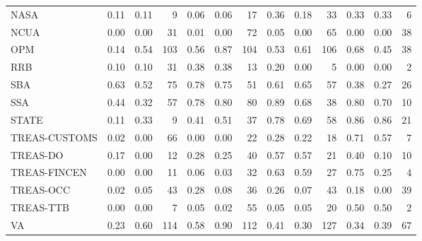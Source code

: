 \begin{table}[ht]
\begin{tabular}{lrrrrrrrrrrrr}
  NASA & 0.11 & 0.11 &   9 & 0.06 & 0.06 &  17 & 0.36 & 0.18 &  33 & 0.33 & 0.33 &   6 \\ 
  NCUA & 0.00 & 0.00 &  31 & 0.01 & 0.00 &  72 & 0.05 & 0.00 &  65 & 0.00 & 0.00 &  38 \\ 
  OPM & 0.14 & 0.54 & 103 & 0.56 & 0.87 & 104 & 0.53 & 0.61 & 106 & 0.68 & 0.45 &  38 \\ 
  RRB & 0.10 & 0.10 &  31 & 0.38 & 0.38 &  13 & 0.20 & 0.00 &   5 & 0.00 & 0.00 &   2 \\ 
  SBA & 0.63 & 0.52 &  75 & 0.78 & 0.75 &  51 & 0.61 & 0.65 &  57 & 0.38 & 0.27 &  26 \\ 
  SSA & 0.44 & 0.32 &  57 & 0.78 & 0.80 &  80 & 0.89 & 0.68 &  38 & 0.80 & 0.70 &  10 \\ 
  STATE & 0.11 & 0.33 &   9 & 0.41 & 0.51 &  37 & 0.78 & 0.69 &  58 & 0.86 & 0.86 &  21 \\ 
  TREAS-CUSTOMS & 0.02 & 0.00 &  66 & 0.00 & 0.00 &  22 & 0.28 & 0.22 &  18 & 0.71 & 0.57 &   7 \\ 
  TREAS-DO & 0.17 & 0.00 &  12 & 0.28 & 0.25 &  40 & 0.57 & 0.57 &  21 & 0.40 & 0.10 &  10 \\ 
  TREAS-FINCEN & 0.00 & 0.00 &  11 & 0.06 & 0.03 &  32 & 0.63 & 0.59 &  27 & 0.75 & 0.25 &   4 \\ 
  TREAS-OCC & 0.02 & 0.05 &  43 & 0.28 & 0.08 &  36 & 0.26 & 0.07 &  43 & 0.18 & 0.00 &  39 \\ 
  TREAS-TTB & 0.00 & 0.00 &   7 & 0.05 & 0.02 &  55 & 0.05 & 0.05 &  20 & 0.50 & 0.50 &   2 \\ 
  VA & 0.23 & 0.60 & 114 & 0.58 & 0.90 & 112 & 0.41 & 0.30 & 127 & 0.34 & 0.39 &  67 \\ 
   \hline
\end{tabular}
\end{table}
